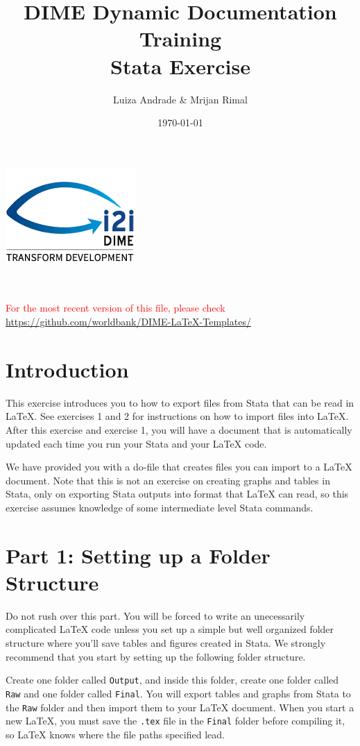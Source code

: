 \documentclass[]{article}
\title{DIME Dynamic Documentation Training \\ Stata Exercise}
\author{Luiza Andrade \& Mrijan Rimal}
\date{\today}
\begin{document}
\makeatletter
\begin{titlepage}
	\begin{center}
		\includegraphics[width=0.3\linewidth]{img/i2i.png}\\[10ex]
		{\LARGE \bfseries  \@title }\\[2ex] 
		{\Large  \@author}\\[20ex] 
		{\large \@date}
	\end{center}
	\vspace{5cm}
	\textcolor{red}{For the most recent version of this file, please check \url{https://github.com/worldbank/DIME-LaTeX-Templates/}}
\end{titlepage}
\makeatother

\section*{Introduction}
This exercise introduces you to how to export files from Stata that can be read in {\LaTeX}. See exercises 1 and 2 for instructions on how to import files into {\LaTeX}. After this exercise and exercise 1, you will have a document that is automatically updated each time you run your Stata and your {\LaTeX} code.

We have provided you with a do-file that creates files you can import to a {\LaTeX} document. Note that this is not an exercise on creating graphs and tables in Stata, only on exporting Stata outputs into format that {\LaTeX} can read, so this exercise assumes knowledge of some intermediate level Stata commands.

\section*{Part 1: Setting up a Folder Structure}
Do not rush over this part. You will be forced to write an unecessarily complicated {\LaTeX} code unless you set up a simple but well organized folder structure where you'll save tables and figures created in Stata. We strongly recommend that you start by setting up the following folder structure. 

Create one folder called \texttt{Output}, and inside this folder, create one folder called \texttt{Raw} and one folder called \texttt{Final}. You will export tables and graphs from Stata to the \texttt{Raw} folder and then import them to your {\LaTeX} document. When you start a new {\LaTeX}, you must save the \texttt{.tex} file in the \texttt{Final} folder before compiling it, so {\LaTeX} knows where the file paths specified lead.
\end{document}

